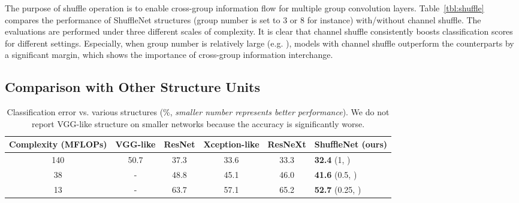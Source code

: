 \documentclass[10pt,twocolumn,letterpaper]{article}
\begin{document}
The purpose of shuffle operation is to enable cross-group information flow for multiple group convolution layers. Table~\ref{tbl:shuffle} compares the performance of ShuffleNet structures (group number is set to 3 or 8 for instance) with/without channel shuffle. The evaluations are performed under three different scales of complexity. It is clear that channel shuffle consistently boosts classification scores for different settings. Especially, when group number is relatively large (e.g. ), models with channel shuffle outperform the counterparts by a significant margin, which shows the importance of cross-group information interchange.

\subsection{Comparison with Other Structure Units}
\label{sec:compother}


\begin{table*}[ht]
	\begin{center}
		\begin{tabular}{c|c|c|c|c|l}
			\hline
			Complexity (MFLOPs) & VGG-like & ResNet & Xception-like & ResNeXt & ShuffleNet (ours) \\
			\hline
			\hline
			140 & 50.7 & 37.3 & 33.6 & 33.3 & \textbf{32.4} (1, ) \\
			38 & - & 48.8 & 45.1 & 46.0 & \textbf{41.6} (0.5, ) \\
			13 & - & 63.7 & 57.1 & 65.2 & \textbf{52.7} (0.25, ) \\
			\hline
		\end{tabular}
	\end{center}
	\caption{Classification error vs. various structures (\%, \emph{smaller number represents better performance}). We do not report VGG-like structure on smaller networks because the accuracy is significantly worse.}
	\label{tbl:structues}
\end{table*}
\end{document}
